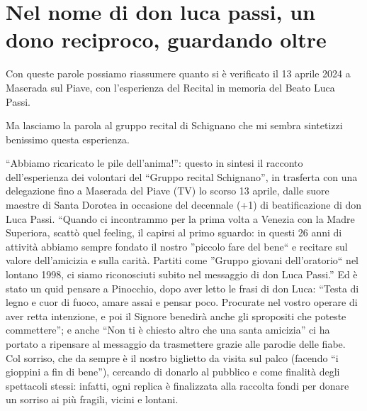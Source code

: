 \section{Nel nome di don luca passi, un dono reciproco, guardando oltre}


Con queste parole possiamo riassumere quanto si è verificato il 13 aprile 2024 a Maserada sul Piave, con l’esperienza del Recital in memoria del Beato Luca Passi.

Ma lasciamo la parola al gruppo recital di Schignano che mi sembra sintetizzi benissimo questa esperienza.


``Abbiamo ricaricato le pile dell’anima!'': questo in sintesi il racconto dell’esperienza dei volontari del “Gruppo recital Schignano”, in trasferta con una delegazione fino a Maserada del Piave (TV) lo scorso 13 aprile, dalle suore maestre di Santa Dorotea in occasione del decennale (+1) di beatificazione di don Luca Passi. ``Quando ci incontrammo per la prima volta a Venezia con la Madre Superiora, scattò quel feeling, il capirsi al primo sguardo: in questi 26 anni di attività abbiamo sempre fondato il nostro ''piccolo fare del bene`` e recitare sul valore dell’amicizia e sulla carità. Partiti come ''Gruppo giovani dell’oratorio`` nel lontano 1998, ci siamo riconosciuti subito nel messaggio di don Luca Passi.''
Ed è stato un quid pensare a Pinocchio, dopo aver letto le frasi di don Luca: ``Testa di legno e cuor di fuoco, amare assai e pensar poco. Procurate nel vostro operare di aver retta intenzione, e poi il Signore benedirà anche gli spropositi che poteste commettere''; e anche ``Non ti è chiesto altro che una santa amicizia'' ci ha portato a ripensare al messaggio da trasmettere grazie alle parodie delle fiabe. Col sorriso, che da sempre è il nostro biglietto da visita sul palco (facendo ``i gioppini a fin di bene''), cercando di donarlo al pubblico e come finalità degli spettacoli stessi: infatti, ogni replica è finalizzata alla raccolta fondi per donare un sorriso ai più fragili, vicini e lontani.


